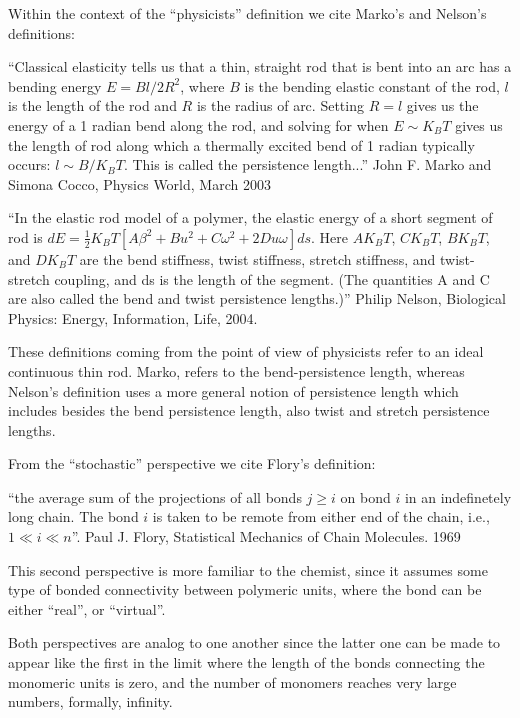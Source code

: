 Within the context of the ``physicists'' definition we cite Marko's
and Nelson's definitions:

``Classical elasticity tells us that a thin, straight rod that is bent
into an arc has a bending energy $E=Bl/2R^2$, where $B$ is the bending
elastic constant of the  rod, $l$ is the length of the  rod and $R$ is
the radius  of arc. Setting  $R=l$ gives us  the energy of a  1 radian
bend along the rod, and solving  for when $E \sim K_{B}T$ gives us the
length  of  rod along  which  a thermally  excited  bend  of 1  radian
typically occurs:  $l \sim B/K_{B}T$.  This is  called the persistence
length...'' John F. Marko and Simona Cocco, Physics World, March 2003

``In the elastic rod model of a polymer, the elastic energy of a short
segment       of       rod       is       $dE=\frac{1}{2}       K_{B}T
[A\beta^2+Bu^2+C\omega^2+2Du\omega]  ds$.  Here  $AK_{B}T$, $CK_{B}T$,
$BK_{B}T$,  and $DK_{B}T$  are  the bend  stiffness, twist  stiffness,
stretch stiffness, and twist-stretch coupling, and ds is the length of
the segment.   (The quantities A  and C are  also called the  bend and
twist  persistence  lengths.)''   Philip Nelson,  Biological  Physics:
Energy, Information, Life, 2004.

These definitions coming from the point of view of physicists refer to
an ideal  continuous thin rod.  Marko, refers  to the bend-persistence
length,  whereas Nelson's  definition uses  a more  general  notion of
persistence length which includes besides the bend persistence length,
also twist and stretch persistence lengths.

From the ``stochastic'' perspective we cite Flory's definition:

``the average sum of  the projections of all bonds $ j  \geq i$ on bond
$i$ in an indefinetely long chain.  The bond $i$ is taken to be remote
from either end of  the chain, i.e., $1 \ll i \ll  n$''. Paul J. Flory,
Statistical Mechanics of Chain Molecules. 1969

This  second perspective  is more  familiar to  the chemist,  since it
assumes  some type  of  bonded connectivity  between polymeric  units,
where the bond can be either ``real'', or ``virtual''.

Both perspectives are  analog to one another since  the latter one can
be made to appear like the first in the limit where the length of
the bonds  connecting the monomeric units  is zero, and  the number of
monomers reaches very large numbers, formally, infinity.

